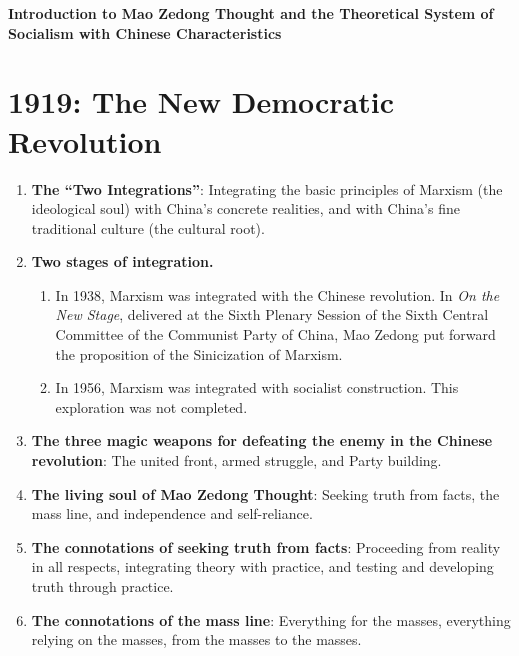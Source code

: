 \documentclass[11pt,a4paper]{ctexart}
\begin{document}
\begin{center}
    {\LARGE \textbf{Introduction to Mao Zedong Thought and the Theoretical System of Socialism with Chinese Characteristics}}
\end{center}

\section{1919: The New Democratic Revolution}

\begin{enumerate}[leftmargin=2em]
    \item \textbf{The ``Two Integrations''}: Integrating the basic principles of Marxism (the ideological soul) with China's concrete realities, and with China's fine traditional culture (the cultural root).
    
    \item \textbf{Two stages of integration.}
    \begin{enumerate}[label=(\arabic*),leftmargin=2em]
        \item In 1938, Marxism was integrated with the Chinese revolution. In \textit{On the New Stage}, delivered at the Sixth Plenary Session of the Sixth Central Committee of the Communist Party of China, Mao Zedong put forward the proposition of the Sinicization of Marxism.
        \item In 1956, Marxism was integrated with socialist construction. This exploration was not completed.
    \end{enumerate}
    
    \item \textbf{The three magic weapons for defeating the enemy in the Chinese revolution}: The united front, armed struggle, and Party building.
    
    \item \textbf{The living soul of Mao Zedong Thought}: Seeking truth from facts, the mass line, and independence and self-reliance.
    
    \item \textbf{The connotations of seeking truth from facts}: Proceeding from reality in all respects, integrating theory with practice, and testing and developing truth through practice.
    
    \item \textbf{The connotations of the mass line}: Everything for the masses, everything relying on the masses, from the masses to the masses.
    

\end{enumerate}
\end{document}
